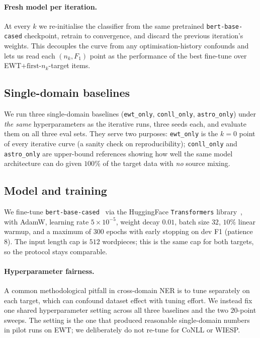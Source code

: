 \documentclass[11pt]{article}
\begin{document}
\paragraph{Fresh model per iteration.}
At every $k$ we re-initialise the classifier from the same pretrained
\texttt{bert-base-cased} checkpoint, retrain to convergence, and discard the
previous iteration's weights. This decouples the curve from any
optimisation-history confounds and lets us read each $(n_k, F_1)$ point as the
performance of the best fine-tune over EWT$+\text{first-}n_k$-target items.

\subsection{Single-domain baselines}
\label{sec:baselines}

We run three single-domain baselines (\texttt{ewt\_only},
\texttt{conll\_only}, \texttt{astro\_only}) under \emph{the same}
hyperparameters as the iterative runs, three seeds each, and evaluate them on
all three eval sets. They serve two purposes: \texttt{ewt\_only} is the
$k{=}0$ point of every iterative curve (a sanity check on reproducibility);
\texttt{conll\_only} and \texttt{astro\_only} are upper-bound references
showing how well the same model architecture can do given $100\%$ of the
target data with \emph{no} source mixing.

\subsection{Model and training}
\label{sec:model}

We fine-tune \texttt{bert-base-cased}~\citep{devlin-etal-2019-bert} via the
HuggingFace \texttt{Transformers} library~\citep{wolf-etal-2020-transformers},
with AdamW, learning rate $5{\times}10^{-5}$, weight decay $0.01$, batch size
$32$, $10\%$ linear warmup, and a maximum of $300$ epochs with early stopping
on dev F1 (patience $8$). The input length cap is $512$ wordpieces; this is
the same cap for both targets, so the protocol stays comparable.

\paragraph{Hyperparameter fairness.}
A common methodological pitfall in cross-domain NER is to tune separately on
each target, which can confound dataset effect with tuning effort. We instead
fix one shared hyperparameter setting across all three baselines and the two
$20$-point sweeps. The setting is the one that produced reasonable
single-domain numbers in pilot runs on EWT; we deliberately do not re-tune for
CoNLL or WIESP.
\end{document}
